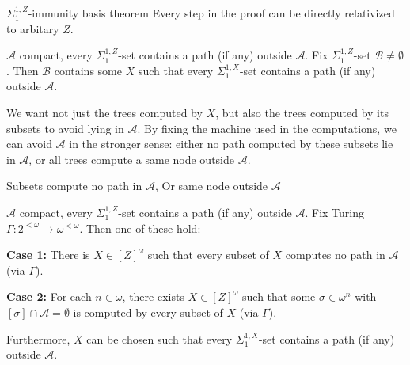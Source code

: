 \begin{frame}{$\Sigma_1^{1,Z}$-immunity basis theorem}
  Every step in the proof can be directly relativized to arbitary $Z$.
  \vspace{0.5em}
  \begin{thm}
    $\mathcal{A}$ compact, every $\Sigma_1^{1,Z}$-set contains a path
    (if any) outside $\mathcal{A}$. Fix $\Sigma_1^{1,Z}$-set
    $\mathcal{B}\neq\emptyset$. Then $\mathcal{B}$ contains some $X$ such
    that every $\Sigma_1^{1,X}$-set contains a path (if any) outside
    $\mathcal{A}$.
  \end{thm}

  \vspace{1em}
  We want not just the trees computed by $X$, but also the trees computed
  by its subsets to avoid lying in $\mathcal{A}$. By fixing the machine
  used in the computations, we can avoid $\mathcal{A}$ in the stronger
  sense: either no path computed by these subsets lie in $\mathcal{A}$, or
  all trees compute a same node outside $\mathcal{A}$.
\end{frame}

\begin{frame}{Subsets compute no path in $\mathcal{A}$, Or same node
outside $\mathcal{A}$}
  \begin{lemma}
    $\mathcal{A}$ compact, every $\Sigma_1^{1,Z}$-set contains a path
    (if any) outside $\mathcal{A}$. Fix Turing $\Gamma:2^{<\omega}
    \rightarrow \omega^{<\omega}$. Then one of these hold:

    \vspace{0.5em}
    \textbf{Case 1:} There is $X\in[Z]^\omega$ such that every subset of
    $X$ computes no path in $\mathcal{A}$ (via $\Gamma$).

    \vspace{0.5em}
    \textbf{Case 2:} For each $n\in\omega$, there exists $X\in[Z]^\omega$
    such that some $\sigma\in\omega^n$ with
    $[\sigma]\cap\mathcal{A}=\emptyset$ is computed by every subset of $X$
    (via $\Gamma$).

    \vspace{0.5em}
    Furthermore, $X$ can be chosen such that every $\Sigma_1^{1,X}$-set
    contains a path (if any) outside $\mathcal{A}$.
  \end{lemma}
\end{frame}

